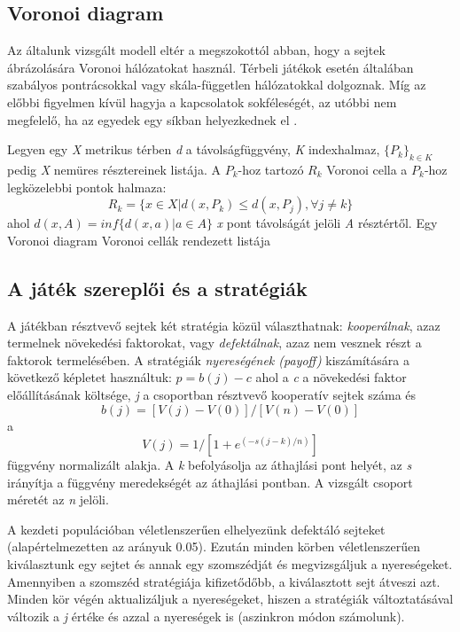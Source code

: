 \subsection{Voronoi diagram}
Az általunk vizsgált modell eltér a megszokottól abban, hogy a sejtek ábrázolására Voronoi hálózatokat használ. Térbeli játékok esetén általában szabályos pontrácsokkal vagy skála-független hálózatokkal dolgoznak. Míg az előbbi figyelmen kívül hagyja a kapcsolatok sokféleségét, az utóbbi nem megfelelő, ha az egyedek egy síkban helyezkednek el \cite{archetti2016cooperation}.

Legyen egy \textit{X} metrikus térben \textit{d} a távolságfüggvény, \textit{K} indexhalmaz, \(\{P_k\}_{k \in K}\) pedig \textit{X} nemüres résztereinek listája. A \(P_k\)-hoz tartozó \(R_k\) Voronoi cella a \(P_k\)-hoz legközelebbi pontok halmaza: 
\begin{equation}
R_k = \{x \in X | d(x,P_k) \leq d(x,P_j), \forall j \neq k\}
\end{equation}
ahol \(d(x,A) = inf\{d(x,a)|a \in A\}\) \textit{x} pont távolságát jelöli \textit{A} résztértől. Egy Voronoi diagram Voronoi cellák rendezett listája
  

\subsection{A játék szereplői és a stratégiák}
A játékban résztvevő sejtek két stratégia közül választhatnak: \textit{kooperálnak}, azaz termelnek növekedési faktorokat, vagy \textit{defektálnak}, azaz nem vesznek részt a faktorok termelésében. A stratégiák \textit{nyereségének (payoff)} kiszámítására a következő képletet használtuk: \(p = b(j) - c\) ahol a \textit{c} a növekedési faktor előállításának költsége, \textit{j} a csoportban résztvevő kooperatív sejtek száma és
\begin{equation}
b(j) = [V(j) - V(0)]/[V(n) - V(0)]
\end{equation}
a
\begin{equation} \label{eq:payoffGradient}
V(j) = 1/[1 + e^{(-s(j-k)/n)}]
\end{equation}
függvény normalizált alakja. A \textit{k} befolyásolja az áthajlási pont helyét, az \textit{s} irányítja a függvény meredekségét az áthajlási pontban. A vizsgált csoport méretét az \textit{n} jelöli. 

A kezdeti populációban véletlenszerűen elhelyezünk defektáló sejteket (alapértelmezetten az arányuk 0.05). Ezután minden körben véletlenszerűen kiválasztunk egy sejtet és annak egy szomszédját és megvizsgáljuk a nyereségeket. Amennyiben a szomszéd stratégiája kifizetődőbb, a kiválasztott sejt átveszi azt. Minden kör végén aktualizáljuk a nyereségeket, hiszen a stratégiák változtatásával változik a \textit{j} értéke és azzal a nyereségek is (aszinkron módon számolunk). 

